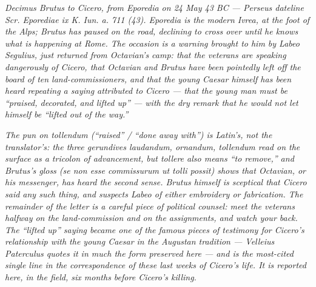 
\textit{Decimus Brutus to Cicero, from Eporedia on 24 May 43 BC ---
Perseus dateline \textit{Scr. Eporediae ix K. Iun. a. 711 (43)}. Eporedia
is the modern Ivrea, at the foot of the Alps; Brutus has paused on the
road, declining to cross over until he knows what is happening at Rome.
The occasion is a warning brought to him by Labeo Segulius, just returned
from Octavian's camp: that the veterans are speaking dangerously of
Cicero, that Octavian and Brutus have been pointedly left off the board
of ten land-commissioners, and that the young Caesar himself has been
heard repeating a saying attributed to Cicero --- that the young man must
be ``praised, decorated, and lifted up'' --- with the dry remark that he
would not let himself be ``lifted out of the way.''}

\textit{The pun on \textit{tollendum} (``raised'' / ``done away with'') is
Latin's, not the translator's: the three gerundives \textit{laudandum,
ornandum, tollendum} read on the surface as a tricolon of advancement,
but \textit{tollere} also means ``to remove,'' and Brutus's gloss
(\textit{se non esse commissurum ut tolli possit}) shows that Octavian, or
his messenger, has heard the second sense. Brutus himself is sceptical
that Cicero said any such thing, and suspects Labeo of either embroidery
or fabrication. The remainder of the letter is a careful piece of
political counsel: meet the veterans halfway on the land-commission and
on the assignments, and watch your back. The ``lifted up'' saying became
one of the famous pieces of testimony for Cicero's relationship with the
young Caesar in the Augustan tradition --- Velleius Paterculus quotes it
in much the form preserved here --- and is the most-cited single line in
the correspondence of these last weeks of Cicero's life. It is reported
here, in the field, six months before Cicero's killing.}
